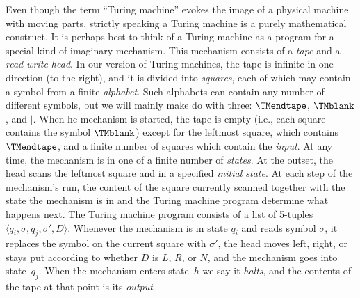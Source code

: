 \documentclass[../../include/open-logic-section]{subfiles}
\begin{document}

\begin{explain}
Even though the term ``Turing machine'' evokes the image of a physical
machine with moving parts, strictly speaking a Turing machine is a
purely mathematical construct.  It is perhaps best to think of a
Turing machine as a program for a special kind of imaginary mechanism.
This mechanism consists of a \emph{tape} and a \emph{read-write head}.
In our version of Turing machines, the tape is infinite in one
direction (to the right), and it is divided into \emph{squares}, each
of which may contain a symbol from a finite \emph{alphabet}.  Such
alphabets can contain any number of different symbols, but we will
mainly make do with three: $\TMendtape$, $\TMblank$, and
$\mid$.  When he mechanism is started, the tape is empty (i.e., each
square contains the symbol $\TMblank$) except for the
leftmost square, which contains $\TMendtape$, and a finite number
of squares which contain the \emph{input}.  At any time, the mechanism
is in one of a finite number of \emph{states}.  At the outset, the
head scans the leftmost square and in a specified \emph{initial
  state}.  At each step of the mechanism's run, the content of the
square currently scanned together with the state the mechanism is in
and the Turing machine program determine what happens next.  The Turing
machine program consists of a list of 5-tuples $\langle q_i, \sigma,
q_j, \sigma', D\rangle$.  Whenever the mechanism is in state $q_i$ and
reads symbol $\sigma$, it replaces the symbol on the current square
with $\sigma'$, the head moves left, right, or stays put according to
whether $D$ is $L$, $R$, or $N$, and the mechanism goes into
state~$q_j$.  When the mechanism enters state~$h$ we say it
\emph{halts}, and the contents of the tape at that point is its
\emph{output}.
\end{explain}
\end{document}

